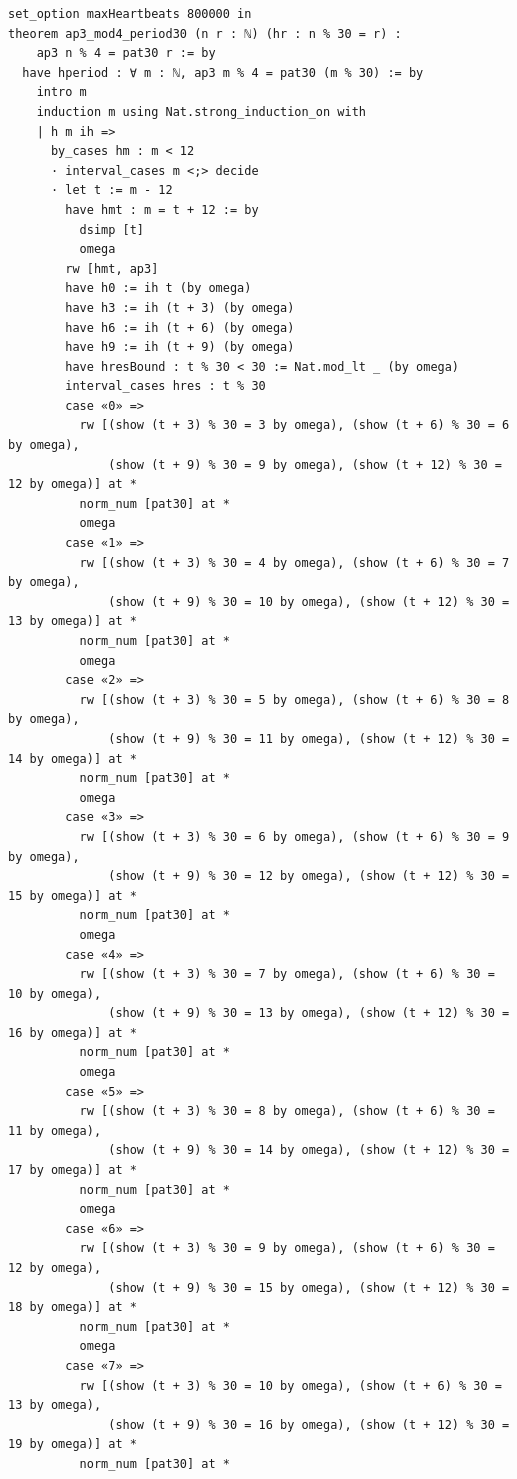 \documentclass[11pt]{article}
\begin{document}
\begin{lstlisting}
set_option maxHeartbeats 800000 in
theorem ap3_mod4_period30 (n r : ℕ) (hr : n % 30 = r) :
    ap3 n % 4 = pat30 r := by
  have hperiod : ∀ m : ℕ, ap3 m % 4 = pat30 (m % 30) := by
    intro m
    induction m using Nat.strong_induction_on with
    | h m ih =>
      by_cases hm : m < 12
      · interval_cases m <;> decide
      · let t := m - 12
        have hmt : m = t + 12 := by
          dsimp [t]
          omega
        rw [hmt, ap3]
        have h0 := ih t (by omega)
        have h3 := ih (t + 3) (by omega)
        have h6 := ih (t + 6) (by omega)
        have h9 := ih (t + 9) (by omega)
        have hresBound : t % 30 < 30 := Nat.mod_lt _ (by omega)
        interval_cases hres : t % 30
        case «0» =>
          rw [(show (t + 3) % 30 = 3 by omega), (show (t + 6) % 30 = 6 by omega),
              (show (t + 9) % 30 = 9 by omega), (show (t + 12) % 30 = 12 by omega)] at *
          norm_num [pat30] at *
          omega
        case «1» =>
          rw [(show (t + 3) % 30 = 4 by omega), (show (t + 6) % 30 = 7 by omega),
              (show (t + 9) % 30 = 10 by omega), (show (t + 12) % 30 = 13 by omega)] at *
          norm_num [pat30] at *
          omega
        case «2» =>
          rw [(show (t + 3) % 30 = 5 by omega), (show (t + 6) % 30 = 8 by omega),
              (show (t + 9) % 30 = 11 by omega), (show (t + 12) % 30 = 14 by omega)] at *
          norm_num [pat30] at *
          omega
        case «3» =>
          rw [(show (t + 3) % 30 = 6 by omega), (show (t + 6) % 30 = 9 by omega),
              (show (t + 9) % 30 = 12 by omega), (show (t + 12) % 30 = 15 by omega)] at *
          norm_num [pat30] at *
          omega
        case «4» =>
          rw [(show (t + 3) % 30 = 7 by omega), (show (t + 6) % 30 = 10 by omega),
              (show (t + 9) % 30 = 13 by omega), (show (t + 12) % 30 = 16 by omega)] at *
          norm_num [pat30] at *
          omega
        case «5» =>
          rw [(show (t + 3) % 30 = 8 by omega), (show (t + 6) % 30 = 11 by omega),
              (show (t + 9) % 30 = 14 by omega), (show (t + 12) % 30 = 17 by omega)] at *
          norm_num [pat30] at *
          omega
        case «6» =>
          rw [(show (t + 3) % 30 = 9 by omega), (show (t + 6) % 30 = 12 by omega),
              (show (t + 9) % 30 = 15 by omega), (show (t + 12) % 30 = 18 by omega)] at *
          norm_num [pat30] at *
          omega
        case «7» =>
          rw [(show (t + 3) % 30 = 10 by omega), (show (t + 6) % 30 = 13 by omega),
              (show (t + 9) % 30 = 16 by omega), (show (t + 12) % 30 = 19 by omega)] at *
          norm_num [pat30] at *

\end{lstlisting}
\end{document}
